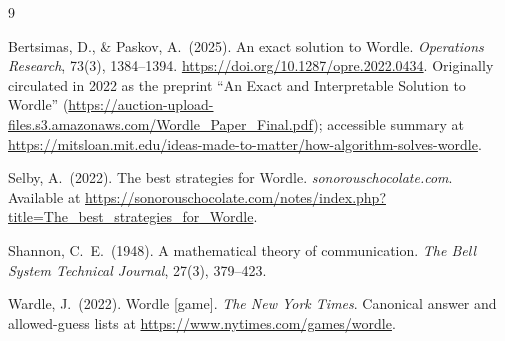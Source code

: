 \documentclass[11pt]{article}
\begin{document}
\begin{thebibliography}{9}
\small

Bertsimas, D., \& Paskov, A.~(2025).
\newblock An exact solution to Wordle.
\newblock \emph{Operations Research}, 73(3), 1384--1394.
\newblock \url{https://doi.org/10.1287/opre.2022.0434}.
\newblock Originally circulated in 2022 as the preprint
``An Exact and Interpretable Solution to Wordle''
(\url{https://auction-upload-files.s3.amazonaws.com/Wordle_Paper_Final.pdf});
accessible summary at
\url{https://mitsloan.mit.edu/ideas-made-to-matter/how-algorithm-solves-wordle}.

Selby, A.~(2022).
\newblock The best strategies for Wordle.
\newblock \emph{sonorouschocolate.com}. Available at
\url{https://sonorouschocolate.com/notes/index.php?title=The_best_strategies_for_Wordle}.

Shannon, C.~E.~(1948).
\newblock A mathematical theory of communication.
\newblock \emph{The Bell System Technical Journal}, 27(3), 379--423.

Wardle, J.~(2022).
\newblock Wordle [game].
\newblock \emph{The New York Times}. Canonical answer and allowed-guess lists
at \url{https://www.nytimes.com/games/wordle}.

\end{thebibliography}
\end{document}
